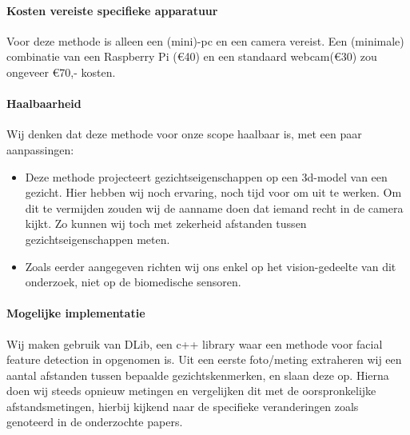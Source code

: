 \documentclass[11pt]{article}
\begin{document}
    \paragraph{Kosten vereiste specifieke apparatuur}
    Voor deze methode is alleen een (mini)-pc en een camera vereist.
    Een (minimale) combinatie van een Raspberry Pi (€40) en een standaard webcam(€30) zou ongeveer €70,- kosten.

    \paragraph{Haalbaarheid}
    Wij denken dat deze methode voor onze scope haalbaar is, met een paar aanpassingen:
    \begin{itemize}
        \item Deze methode projecteert gezichtseigenschappen op een 3d-model van een gezicht. Hier hebben wij noch ervaring, noch tijd voor om uit te werken.
        Om dit te vermijden zouden wij de aanname doen dat iemand recht in de camera kijkt.
        Zo kunnen wij toch met zekerheid afstanden tussen gezichtseigenschappen meten.
        \item Zoals eerder aangegeven richten wij ons enkel op het vision-gedeelte van dit onderzoek, niet op de biomedische sensoren.
    \end{itemize}

    \paragraph{Mogelijke implementatie}
    Wij maken gebruik van DLib, een c++ library waar een methode voor facial feature detection in opgenomen is.
    Uit een eerste foto/meting extraheren wij een aantal afstanden tussen bepaalde gezichtskenmerken, en slaan deze op.
    Hierna doen wij steeds opnieuw metingen en vergelijken dit met de oorspronkelijke afstandsmetingen,
    hierbij kijkend naar de specifieke veranderingen zoals genoteerd in de onderzochte papers.



    
    
\end{document}
